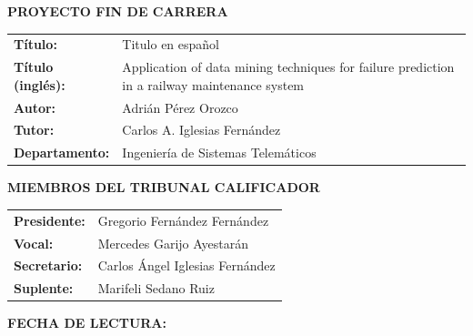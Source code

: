 \documentclass[a4paper,11pt,svgnames]{book}
\begin{document}
\newcommand\litem[1]{\item{\bfseries #1 }}
\renewcommand{\arraystretch}{1.5} %

\newcommand\headcell[1]{%
  \multicolumn{1}{c|}{\cellcolor{DodgerBlue}\bfseries\sffamily\textcolor{white}{#1}}
}

\renewcommand{\listtablename}{Tables Index}
\renewcommand{\tablename}{Table} 



\thispagestyle{empty}
\vspace*{3\baselineskip}
{\large{\bf PROYECTO FIN DE CARRERA}}
\vspace{0.5cm}

\begin{rm}
\begin{tabular}{p{3cm}p{10cm}}
\textbf{Título:} & Titulo en español\\ 
\textbf{Título (inglés):} & Application of data mining techniques for failure prediction in a railway maintenance system\\ 
\textbf{Autor:} & Adrián Pérez Orozco \\ 
\textbf{Tutor:} & Carlos A. Iglesias Fernández\\ 
\textbf{Departamento:} & Ingeniería de Sistemas Telemáticos \\ 
\end{tabular} \end{rm} \vspace{1cm}

{\large{\bf MIEMBROS DEL TRIBUNAL CALIFICADOR}} \vspace{0.5cm}

\begin{rm}
\begin{tabular}{p{3cm}p{10cm}}
\textbf{Presidente:} & Gregorio Fernández Fernández\\
\textbf{Vocal:} & Mercedes Garijo Ayestarán\\
\textbf{Secretario:} & Carlos Ángel Iglesias Fernández\\
\textbf{Suplente:} & Marifeli Sedano Ruiz
\end{tabular}
\end{rm}
\vspace{1cm}

{\large{\bf FECHA DE LECTURA:}}
\vspace{1cm}
\end{document}
